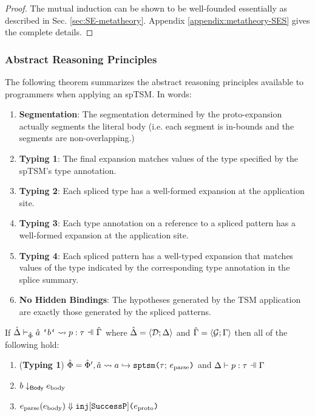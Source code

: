 {{{{\begin{proof}
The mutual induction can be shown to be well-founded essentially as described in Sec. \ref{sec:SE-metatheory}. Appendix \ref{appendix:metatheory-SES} gives the complete details.
\end{proof}

\subsubsection{Abstract Reasoning Principles}\label{sec:uptsms-abstract-reasoning-principles}
The following theorem summarizes the abstract reasoning principles available to programmers when applying an spTSM. In words:
\begin{enumerate}
  \item \textbf{Segmentation}: The segmentation determined by the proto-expansion actually segments the literal body (i.e. each segment is in-bounds and the segments are non-overlapping.)
  \item \textbf{Typing 1}: The final expansion matches values of the type specified by the spTSM's type annotation.
  \item \textbf{Typing 2}: Each spliced type has a well-formed expansion at the application site.
  \item \textbf{Typing 3}: Each type annotation on a reference to a spliced pattern has a well-formed expansion at the application site.
  \item \textbf{Typing 4}: Each spliced pattern has a well-typed expansion that matches values of the type indicated by the corresponding type annotation in the splice summary.
  \item \textbf{No Hidden Bindings}: The hypotheses generated by the TSM application are exactly those generated by the spliced patterns.
\end{enumerate}
\begingroup
\def\thetheorem{\ref{thm:spTSM-Typing-Segmentation}}
\begin{theorem}
If $\patExpands{\upctx}{\uPhi}{\utsmap{\tsmv}{b}}{p}{\tau}$ where $\hat{\Delta}=\langle \mathcal{D}; \Delta \rangle$ and $\hat{\Gamma}=\langle \mathcal{G}; \Gamma \rangle$ then all of the following hold:
\begin{enumerate}
        \item (\textbf{Typing 1}) $\hat\Phi=\hat\Phi', \hat{a} \leadsto a \hookrightarrow \texttt{sptsm}\texttt{(}\tau;\,e_\text{parse}\texttt{)}$ and $\patType{\pctx}{p}{\tau}$
        \item $b \downarrow_\mathsf{Body} e_\text{body}$
        \item $e_\text{parse}(e_\text{body}) \Downarrow \texttt{inj}[\mathtt{SuccessP}]\texttt{(}e_\text{proto}\texttt{)}$

\end{enumerate}
\end{theorem}}}}}
